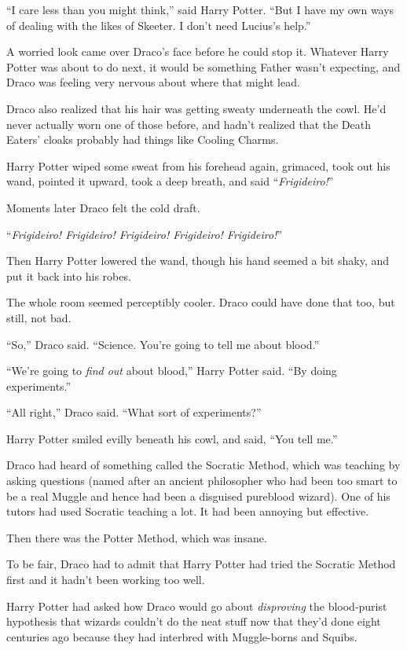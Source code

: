 “I care less than you might think,” said Harry Potter. “But I have my own ways of dealing with the likes of Skeeter. I don’t need Lucius’s help.”

A worried look came over Draco’s face before he could stop it. Whatever Harry Potter was about to do next, it would be something Father wasn’t expecting, and Draco was feeling very nervous about where that might lead.

Draco also realized that his hair was getting sweaty underneath the cowl. He’d never actually worn one of those before, and hadn’t realized that the Death Eaters’ cloaks probably had things like Cooling Charms.

Harry Potter wiped some sweat from his forehead again, grimaced, took out his wand, pointed it upward, took a deep breath, and said “\emph{Frigideiro!}”

Moments later Draco felt the cold draft.

“\emph{Frigideiro! Frigideiro! Frigideiro! Frigideiro! Frigideiro!}”

Then Harry Potter lowered the wand, though his hand seemed a bit shaky, and put it back into his robes.

The whole room seemed perceptibly cooler. Draco could have done that too, but still, not bad.

“So,” Draco said. “Science. You’re going to tell me about blood.”

“We’re going to \emph{find out} about blood,” Harry Potter said. “By doing experiments.”

“All right,” Draco said. “What sort of experiments?”

Harry Potter smiled evilly beneath his cowl, and said, “You tell me.”

\later

Draco had heard of something called the Socratic Method, which was teaching by asking questions (named after an ancient philosopher who had been too smart to be a real Muggle and hence had been a disguised pureblood wizard). One of his tutors had used Socratic teaching a lot. It had been annoying but effective.

Then there was the Potter Method, which was insane.

To be fair, Draco had to admit that Harry Potter had tried the Socratic Method first and it hadn’t been working too well.

Harry Potter had asked how Draco would go about \emph{disproving} the blood-purist hypothesis that wizards couldn’t do the neat stuff now that they’d done eight centuries ago because they had interbred with Muggle-borns and Squibs.

